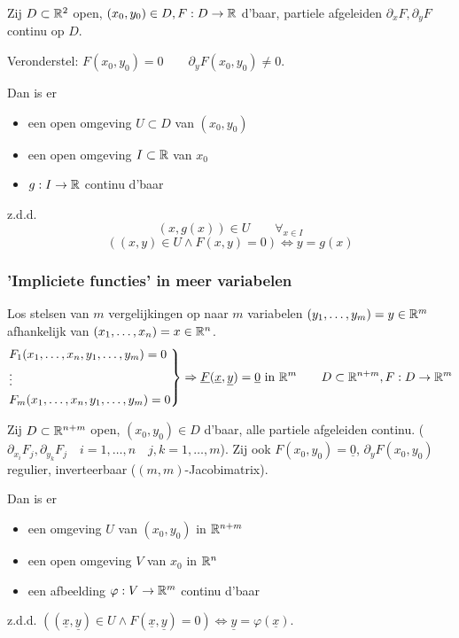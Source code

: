 \documentclass{2wa40summary}
\begin{document}
			 Zij $D \subset \mathbb{R}^2$ open, $ (x_0 , y_0 ) \in D, F:D \rightarrow \mathbb{R} $ d'baar, partiele afgeleiden $ \partial_x F, \partial_y F $ continu op $ D $.
			
			Veronderstel: $ F(x_0, y_0) = 0 \qquad \partial_y F(x_0, y_0)\neq 0 $.
			
			Dan is er 
			\begin{itemize} 
				\item[] een open omgeving $ U \subset D $ van $ (x_0,y_0) $
				\item[] een open omgeving $ I \subset \mathbb{R} $ van $ x_0 $
				\item[] $ g: I \rightarrow \mathbb{R} $ continu d'baar 
			\end{itemize}
			z.d.d.
			\[ (x,g(x)) \in U \qquad \forall_{x \in I} \]
			\[ ((x,y) \in U \wedge F(x,y)=0) \Leftrightarrow y=g(x) \]
			
			
			\subsubsection{'Impliciete functies' in meer variabelen}
				Los stelsen van $m$ vergelijkingen op naar $m$ variabelen $(y_1, \dots ,y_m) = y \in \mathbb{R}^m$ afhankelijk van $ (x_1, \dots , x_n) = x \in \mathbb{R}^n $.
				\[
				\begin{rcases*}
				F_1(x_1,\dots,x_n,y_1,\dots,y_m)=0 \\
				\vdots \\
				F_m(x_1,\dots,x_n,y_1,\dots,y_m)=0
				\end{rcases*} \Rightarrow \underline{F}(\underline{x},\underline{y})=\underline{0} \text{ in } \reals^m \qquad D \subset \reals^{n+m}, F: D \rightarrow \reals^m
				\]
				
				 Zij $ D\subset \mathbb{R}^{n+m} $ open, $ (x_0, y_0) \in D $ d'baar, alle partiele afgeleiden continu. ($ \partial_{x_i}F_j , \partial_{y_k}F_j \quad i=1,\dots,n \quad j,k=1,\dots,m $). Zij ook $ F(x_0, y_0) = \underline{0}$, $ \partial_y F(x_0,y_0) $ regulier, inverteerbaar ($ (m,m) $-Jacobimatrix).
				
				Dan is er \begin{itemize}
					\item[] een omgeving $ U $ van $ (x_0,y_0) $ in $ \mathbb{R}^{n+m} $
					\item[] een open omgeving $V$ van $x_0$ in $\mathbb{R}^n$
					\item[] een afbeelding $ \varphi : V\rightarrow \mathbb{R}^m $ continu d'baar 
				\end{itemize}
				z.d.d. $ ((\underline{x},\underline{y}) \in U \wedge F(\underline{x},\underline{y})=0) \Leftrightarrow \underline{y}=\varphi (\underline{x}). $
				
\end{document}
